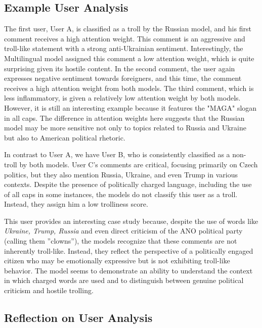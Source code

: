 \documentclass[twoside]{ctuthesis}
\theoremstyle{plain}
\theoremstyle{definition}
\theoremstyle{note}
\begin{document}
\subsection{Example User Analysis}

The first user, User A, is classified as a troll by the Russian model, and his first comment receives a high attention weight. This comment is an aggressive and troll-like statement with a strong anti-Ukrainian sentiment. Interestingly, the Multilingual model assigned this comment a low attention weight, which is quite surprising given its hostile content. In the second comment, the user again expresses negative sentiment towards foreigners, and this time, the comment receives a high attention weight from both models. The third comment, which is less inflammatory, is given a relatively low attention weight by both models. However, it is still an interesting example because it features the "MAGA" slogan in all caps. The difference in attention weights here suggests that the Russian model may be more sensitive not only to topics related to Russia and Ukraine but also to American political rhetoric.\par

In contrast to User A, we have User B, who is consistently classified as a non-troll by both models. User C's comments are critical, focusing primarily on Czech politics, but they also mention Russia, Ukraine, and even Trump in various contexts. Despite the presence of politically charged language, including the use of all caps in some instances, the models do not classify this user as a troll. Instead, they assign him a low trolliness score.\par

This user provides an interesting case study because, despite the use of words like \textit{Ukraine, Trump, Russia} and even direct criticism of the ANO political party (calling them ''clowns''), the models recognize that these comments are not inherently troll-like. Instead, they reflect the perspective of a politically engaged citizen who may be emotionally expressive but is not exhibiting troll-like behavior. The model seems to demonstrate an ability to understand the context in which charged words are used and to distinguish between genuine political criticism and hostile trolling.\par

\subsection{Reflection on User Analysis}
\end{document}

